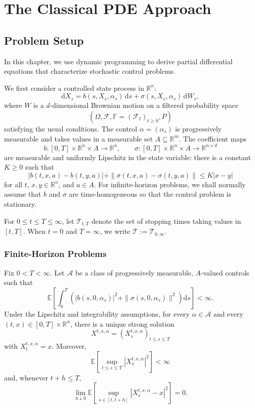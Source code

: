 \chapter{The Classical PDE Approach}

\section{Problem Setup}

In this chapter, we use dynamic programming to derive partial differential equations that characterize stochastic control problems.

We first consider a controlled state process in \(\mathbb R^n\):
\[
\mathrm dX_s
=b(s,X_s,\alpha_s)\,\mathrm ds
+\sigma(s,X_s,\alpha_s)\,\mathrm dW_s,
\]
where \(W\) is a \(d\)-dimensional Brownian motion on a filtered probability space
\[
(\Omega,\mathcal F,\mathbb F=(\mathcal F_t)_{t\ge0},P)
\]
satisfying the usual conditions. The control \(\alpha=(\alpha_s)\) is progressively measurable and takes values in a measurable set \(A\subseteq\mathbb R^m\). The coefficient maps
\[
b:[0,T]\times\mathbb R^n\times A\to\mathbb R^n,
\qquad
\sigma:[0,T]\times\mathbb R^n\times A\to\mathbb R^{n\times d}
\]
are measurable and uniformly Lipschitz in the state variable: there is a constant \(K\ge0\) such that
\[
|b(t,x,a)-b(t,y,a)|
+\|\sigma(t,x,a)-\sigma(t,y,a)\|
\le K|x-y|
\]
for all \(t\), \(x,y\in\mathbb R^n\), and \(a\in A\). For infinite-horizon problems, we shall normally assume that \(b\) and \(\sigma\) are time-homogeneous so that the control problem is stationary.

For \(0\le t\le T\le\infty\), let \(\mathcal T_{t,T}\) denote the set of stopping times taking values in \([t,T]\). When \(t=0\) and \(T=\infty\), we write \(\mathcal T:=\mathcal T_{0,\infty}\).

\subsection{Finite-Horizon Problems}

Fix \(0<T<\infty\). Let \(\mathcal A\) be a class of progressively measurable, \(A\)-valued controls such that
\[
\mathbb E\!\left[
\int_0^T
\left(
|b(s,0,\alpha_s)|^2
+\|\sigma(s,0,\alpha_s)\|^2
\right)\mathrm ds
\right]<\infty.
\]
Under the Lipschitz and integrability assumptions, for every \(\alpha\in\mathcal A\) and every \((t,x)\in[0,T]\times\mathbb R^n\), there is a unique strong solution
\[
X^{t,x,\alpha}=(X_s^{t,x,\alpha})_{t\le s\le T}
\]
with \(X_t^{t,x,\alpha}=x\). Moreover,
\[
\mathbb E\!\left[
\sup_{t\le s\le T}|X_s^{t,x,\alpha}|^2
\right]<\infty
\]
and, whenever \(t+h\le T\),
\[
\lim_{h\downarrow0}
\mathbb E\!\left[
\sup_{s\in[t,t+h]}
|X_s^{t,x,\alpha}-x|^2
\right]=0.
\]

